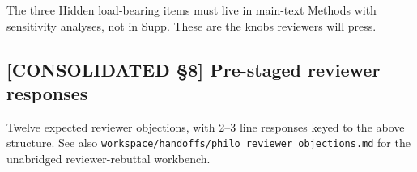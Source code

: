 The three Hidden load-bearing items must live in main-text Methods with sensitivity analyses, not in Supp. These are the knobs reviewers will press.

\subsection*{[CONSOLIDATED §8] Pre-staged reviewer responses}
\label{philo:reviewer_preempt}

Twelve expected reviewer objections, with 2--3 line responses keyed to the above structure. See also \texttt{workspace/handoffs/philo\_reviewer\_objections.md} for the unabridged reviewer-rebuttal workbench.

